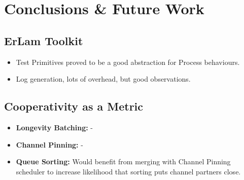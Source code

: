 \section{Conclusions \& Future Work}

\subsection{ErLam Toolkit}

\begin{slide}
    \begin{itemize}
        \item Test Primitives proved to be a good abstraction for 
            Process behaviours.
        \item Log generation, lots of overhead, but good observations.
    \end{itemize}

\end{slide}


\subsection{Cooperativity as a Metric}

\begin{slide}
    \begin{itemize}
        \item {\bf Longevity Batching:} -  
        \item {\bf Channel Pinning:} -  
        \item {\bf Queue Sorting:} Would benefit from merging with
            Channel Pinning scheduler to increase likelihood that
            sorting puts channel partners close. 
    \end{itemize}

\end{slide}


